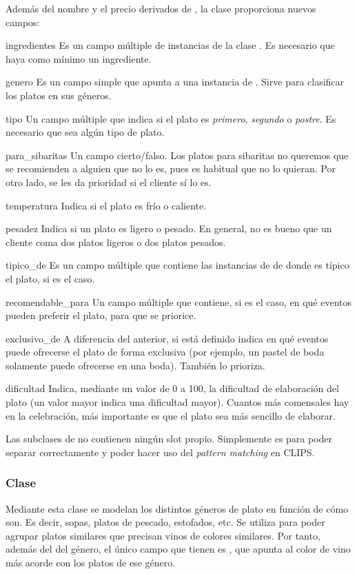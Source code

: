 Además del nombre y el precio derivados de , la clase
 proporciona nuevos campos:
\begin{slotlist}
\item[ingredientes] Es un campo múltiple de instancias de la clase
  . Es necesario que haya como mínimo un ingrediente.
\item[genero] Es un campo simple que apunta a una instancia de
  . Sirve para clasificar los platos en sus géneros.
\item[tipo] Un campo múltiple que indica si el plato es \emph{primero},
  \emph{segundo} o \emph{postre}. Es necesario que sea algún tipo de plato.
\item[para\_sibaritas] Un campo cierto/falso. Los platos para sibaritas no
  queremos que se recomienden a alguien que no lo es, pues es habitual que no
  lo quieran. Por otro lado, se les da prioridad si el cliente sí lo es.
\item[temperatura] Indica si el plato es frío o caliente.
\item[pesadez] Indica si un plato es ligero o pesado. En general, no es bueno
  que un cliente coma dos platos ligeros o dos platos pesados.
\item[tipico\_de] Es un campo múltiple que contiene las instancias de
   de donde es típico el plato, si es el caso.
\item[recomendable\_para] Un campo múltiple que contiene, si es el caso, en qué
  eventos pueden preferir el plato, para que se priorice.
\item[exclusivo\_de] A diferencia del anterior, si está definido indica en qué
  eventos puede ofrecerse el plato de forma exclusiva (por ejemplo, un pastel
  de boda solamente puede ofrecerse en una boda). También lo prioriza.
\item[dificultad] Indica, mediante un valor de 0 a 100, la dificultad de
  elaboración del plato (un valor mayor indica una dificultad mayor). Cuantos
  más comensales hay en la celebración, más importante es que el plato sea más
  sencillo de elaborar.
\end{slotlist}

Las subclases de  no contienen ningún slot propio. Simplemente es
para poder separar correctamente y poder hacer uso del \emph{pattern matching}
en CLIPS.

\subsubsection{Clase }
Mediante esta clase se modelan los distintos géneros de plato en función de
cómo son. Es decir, sopas, platos de pescado, estofados, etc. Se utiliza para
poder agrupar platos similares que precisan vinos de colores similares. Por
tanto, además del  del género, el único campo que tienen es
, que apunta al color de vino más acorde con los platos de ese
género.


